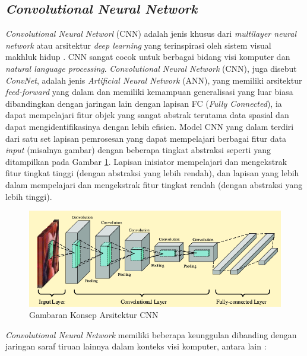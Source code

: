 \subsection{\textit{Convolutional Neural Network}}
\label{subsec:cnn}

\textit{Convolutional Neural Networl} (CNN) adalah jenis khusus dari \textit{multilayer neural network} atau arsitektur \textit{deep learning} yang terinspirasi oleh sistem visual makhluk hidup \citep{cnn}. CNN sangat cocok untuk berbagai bidang visi komputer dan \textit{natural language processing}. \textit{Convolutional Neural Network} (CNN), juga disebut \textit{ConvNet}, adalah jenis \textit{Artificial Neural Network} (ANN), yang memiliki arsitektur \textit{feed-forward} yang dalam dan memiliki kemampuan generalisasi yang luar biasa dibandingkan dengan jaringan lain dengan lapisan FC (\textit{Fully Connected}), ia dapat mempelajari fitur objek yang sangat abstrak terutama data spasial dan dapat mengidentifikasinya dengan lebih efisien. Model CNN yang dalam terdiri dari satu set lapisan pemrosesan yang dapat mempelajari berbagai fitur data \textit{input} (misalnya gambar) dengan beberapa tingkat abstraksi seperti yang ditampilkan pada Gambar \ref{fig:concept-cnn}. Lapisan inisiator mempelajari dan mengekstrak fitur tingkat tinggi (dengan abstraksi yang lebih rendah), dan lapisan yang lebih dalam mempelajari dan mengekstrak fitur tingkat rendah (dengan abstraksi yang lebih tinggi).

\begin{figure}[ht]
	\centering
	\includegraphics[scale=0.3]{gambar/concept-cnn.png}
	\caption{Gambaran Konsep Arsitektur CNN \citep{concept-cnn}}
	\label{fig:concept-cnn}
\end{figure}

\textit{Convolutional Neural Network} memiliki beberapa keunggulan dibanding dengan jaringan saraf tiruan lainnya dalam konteks visi komputer, antara lain :

